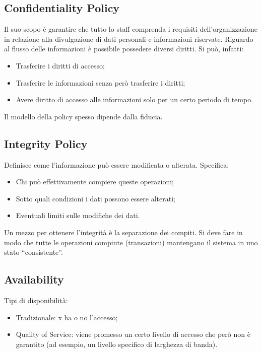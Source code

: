 \subsection{Confidentiality Policy}

Il suo scopo è garantire che tutto lo staff comprenda i requisiti 
dell'organizzazione in relazione alla
divulgazione di dati personali e informazioni riservate.
Riguardo al flusso delle informazioni è possibile possedere diversi
diritti. Si può, infatti:
\begin{itemize}
    \item Trasferire i diritti di accesso;
    \item Trasferire le informazioni senza però trasferire i diritti;
    \item Avere diritto di accesso alle informazioni solo per un certo
          periodo di tempo.
\end{itemize}

Il modello della policy spesso dipende dalla fiducia.

\subsection{Integrity Policy}

Definisce come l’informazione può essere modificata o alterata. 
Specifica:
\begin{itemize}
    \item Chi può effettivamente compiere queste operazioni;
    \item Sotto quali condizioni i dati possono essere alterati;
    \item Eventuali limiti sulle modifiche dei dati.
\end{itemize}

Un mezzo per ottenere l’integrità è la separazione dei compiti.
Si deve fare in modo che tutte le operazioni compiute (transazioni) mantengano il sistema in uno
stato “consistente”.

\subsection{Availability}

Tipi di disponibilità:
\begin{itemize}
    \item Tradizionale: x ha o no l’accesso;
    \item Quality of Service: viene promesso un certo livello di accesso
          che però non è garantito (ad esempio, un livello
          specifico di larghezza di banda).
\end{itemize}

